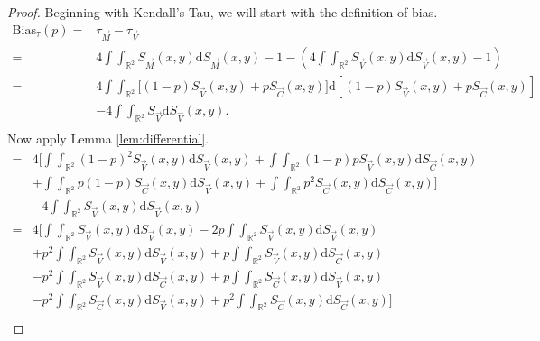\begin{proof}
    Beginning with Kendall's Tau, we will start with the definition of bias.\\
    \begin{align*}
        \text{Bias}_{\tau}\left(p\right)=&\tau_{\vec{M}}-\tau_{\vec{V}}\\
        =&4\int\int_{\mathbb{R}^2}S_{\vec{M}}\left(x,y\right)\mathrm{d}S_{\vec{M}}\left(x,y\right)-1-\left(4\int\int_{\mathbb{R}^2}S_{\vec{V}}\left(x,y\right)\mathrm{d}S_{\vec{V}}\left(x,y\right)-1\right)\\
        =&4\int\int_{\mathbb{R}^2}\big[\left(1-p\right)S_{\vec{V}}\left(x,y\right)+pS_{\vec{C}}\left(x,y\right)\big]\mathrm{d}\left[\left(1-p\right)S_{\vec{V}}\left(x,y\right)+pS_{\vec{C}}\left(x,y\right)\right]\\
        &-4\int\int_{\mathbb{R}^2}S_{\vec{V}}\mathrm{d}S_{\vec{V}}\left(x,y\right).\\
    \end{align*}
    Now apply Lemma \ref{lem:differential}.
    \begin{align*}
        =&4\bigg[\int\int_{\mathbb{R}^2}\left(1-p\right)^2S_{\vec{V}}\left(x,y\right)\mathrm{d}S_{\vec{V}}\left(x,y\right)+\int\int_{\mathbb{R}^2}\left(1-p\right)pS_{\vec{V}}\left(x,y\right)\mathrm{d}S_{\vec{C}}\left(x,y\right)\\
        &+\int\int_{\mathbb{R}^2}p\left(1-p\right)S_{\vec{C}}\left(x,y\right)\mathrm{d}S_{\vec{V}}\left(x,y\right)+\int\int_{\mathbb{R}^2}p^2S_{\vec{C}}\left(x,y\right)\mathrm{d}S_{\vec{C}}\left(x,y\right)\bigg]\\
        &-4\int\int_{\mathbb{R}^2}S_{\vec{V}}\left(x,y\right)\mathrm{d}S_{\vec{V}}\left(x,y\right)\\
        =&4\bigg[\int\int_{\mathbb{R}^2}S_{\vec{V}}\left(x,y\right)\mathrm{d}S_{\vec{V}}\left(x,y\right)-2p\int\int_{\mathbb{R}^2}S_{\vec{V}}\left(x,y\right)\mathrm{d}S_{\vec{V}}\left(x,y\right)\\
        &+p^2\int\int_{\mathbb{R}^2}S_{\vec{V}}\left(x,y\right)\mathrm{d}S_{\vec{V}}\left(x,y\right)+p\int\int_{\mathbb{R}^2}S_{\vec{V}}\left(x,y\right)\mathrm{d}S_{\vec{C}}\left(x,y\right)\\
        &-p^2\int\int_{\mathbb{R}^2}S_{\vec{V}}\left(x,y\right)\mathrm{d}S_{\vec{C}}\left(x,y\right)+p\int\int_{\mathbb{R}^2}S_{\vec{C}}\left(x,y\right)\mathrm{d}S_{\vec{V}}\left(x,y\right)\\
        &-p^2\int\int_{\mathbb{R}^2}S_{\vec{C}}\left(x,y\right)\mathrm{d}S_{\vec{V}}\left(x,y\right)+p^2\int\int_{\mathbb{R}^2}S_{\vec{C}}\left(x,y\right)\mathrm{d}S_{\vec{C}}\left(x,y\right)\bigg]\\

\end{align*}
\end{proof}

